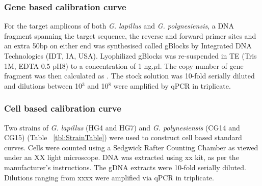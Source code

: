 \documentclass[12pt]{article}
\begin{document}
\subsubsection*{Gene based calibration curve}
For the target amplicons of both \emph{G. lapillus} and \emph{G. polynesiensis}, a DNA fragment spanning the target sequence, the reverse and forward primer sites and an extra 50bp on either end was synthesised called gBlocks \textsuperscript{\textregistered} by Integrated DNA Technologies (IDT, IA, USA). Lyophilized gBlocks \textsuperscript{\textregistered} was re-suspended in TE (Tris 1M, EDTA 0.5 pH8) to a concentration of 1 ng.$\mu$l. The copy number of gene fragment was then {\Large calculated as }.
The stock solution was 10-fold serially diluted and dilutions between 10$^{3}$ and 10$^{8}$ were amplified by qPCR in triplicate.


\subsubsection*{Cell based calibration curve}
Two strains of \emph{G. lapillus} (HG4 and HG7) and \emph{G. polynesiensis} (CG14 and CG15) (Table ~\ref{tbl:StrainTable}) were used to construct cell based standard curves. Cells were counted using a Sedgwick Rafter Counting Chamber as viewed under {\Large an XX light} microscope. DNA was extracted {\Large using xx kit}, as per the manufacturer's instructions. The gDNA extracts were 10-fold serially diluted. Dilutions ranging from {\Large xxxx} were amplified via qPCR in triplicate.
\end{document}
